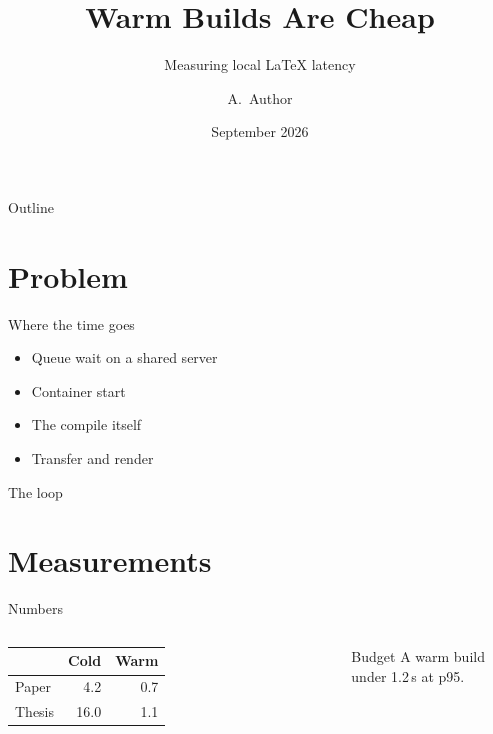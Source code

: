 \documentclass[aspectratio=169]{beamer}
\title{Warm Builds Are Cheap}
\subtitle{Measuring local \LaTeX{} latency}
\author{A.~Author}
\institute{Department of Writing Tools}
\date{September 2026}
\begin{document}
\begin{frame}
  \titlepage
\end{frame}

\begin{frame}{Outline}
  \tableofcontents
\end{frame}

\section{Problem}

\begin{frame}{Where the time goes}
  \begin{itemize}
    \item<1-> Queue wait on a shared server
    \item<2-> Container start
    \item<3-> The compile itself
    \item<4-> Transfer and render
  \end{itemize}
\end{frame}

\begin{frame}{The loop}
  \centering
\end{frame}

\section{Measurements}

\begin{frame}{Numbers}
  \begin{columns}
    \begin{tabular}{lrr}
      \toprule
      & Cold & Warm \\
      \midrule
      Paper & 4.2 & 0.7 \\
      Thesis & 16.0 & 1.1 \\
      \bottomrule
    \end{tabular}
    \begin{block}{Budget}
      A warm build under \alert{1.2\,s} at p95.
    \end{block}
  \end{columns}
\end{frame}
\end{document}
